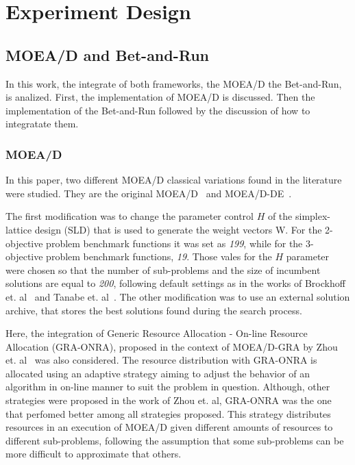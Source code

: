 \section{Experiment Design}

\subsection{MOEA/D and Bet-and-Run}

In this work, the integrate of both frameworks, the MOEA/D the Bet-and-Run, is analized. First, the implementation of MOEA/D is discussed. Then the implementation of the Bet-and-Run followed by the discussion of how to integratate them.

\subsubsection{MOEA/D}

In this paper, two different MOEA/D classical variations found in the literature were studied. They are the original MOEA/D~\cite{zhang2007moea} and MOEA/D-DE~\cite{li2009multiobjective}. 

The first modification was to change the parameter control $H$ of the simplex-lattice design (SLD) that is used to generate the weight vectors W. For the 2-objective problem benchmark functions it was set as \textit{199}, while for the 3-objective problem benchmark functions, \textit{19}. Those vales for the $H$ parameter were chosen so that the number of sub-problems and the size of incumbent solutions are equal to \textit{200}, following default settings as in the works of Brockhoff et. al~\cite{brockhoff2015benchmarking} and Tanabe et. al~\cite{tanabe2018analysis}. The other modification was to use an external solution archive, that stores the best solutions found during the search process.



Here, the integration of Generic Resource Allocation - On-line Resource Allocation (GRA-ONRA), proposed in the context of MOEA/D-GRA by Zhou et. al~\cite{zhou2016all} was also considered. The resource distribution with GRA-ONRA is allocated using an adaptive strategy aiming to adjust the behavior of an algorithm in on-line manner to suit the problem in question. Although, other strategies were proposed in the work of Zhou et. al, GRA-ONRA was the one that perfomed better among all strategies proposed. This strategy distributes resources in an execution of MOEA/D given different amounts of resources to different sub-problems, following the assumption that some sub-problems can be more difficult to approximate that others.

